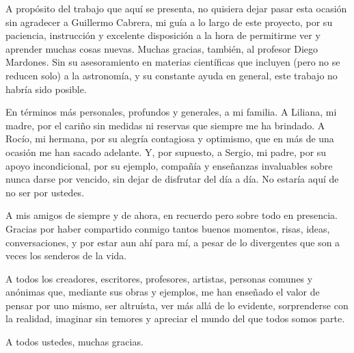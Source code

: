 \documentclass[upright, contnum]{umemoria}
\begin{document}
\begin{thanks}
A propósito del trabajo que aquí se presenta, no quisiera dejar pasar esta ocasión sin agradecer a Guillermo Cabrera, mi guía a lo largo de este proyecto, por su paciencia, instrucción y excelente disposición a la hora de permitirme ver y aprender muchas cosas nuevas. Muchas gracias, también, al profesor Diego Mardones. Sin su asesoramiento en materias científicas que incluyen (pero no se reducen solo) a la astronomía, y su constante ayuda en general, este trabajo no habría sido posible.

En términos más personales, profundos y generales, a mi familia. A Liliana, mi madre, por el cariño sin medidas ni reservas que siempre me ha brindado. A Rocío, mi hermana, por su alegría contagiosa y optimismo, que en más de una ocasión me han sacado adelante. Y, por supuesto, a Sergio, mi padre, por su apoyo incondicional, por su ejemplo, compañía y enseñanzas invaluables sobre nunca darse por vencido, sin dejar de disfrutar del día a día. No estaría aquí de no ser por ustedes.

A mis amigos de siempre y de ahora, en recuerdo pero sobre todo en presencia. Gracias por haber compartido conmigo tantos buenos momentos, risas, ideas, conversaciones, y por estar aun ahí para mí, a pesar de lo divergentes que son a veces los senderos de la vida.

A todos los creadores, escritores, profesores, artistas, personas comunes y anónimas que, mediante sus obras y ejemplos, me han enseñado el valor de pensar por uno mismo, ser altruísta, ver más allá de lo evidente, sorprenderse con la realidad, imaginar sin temores y apreciar el mundo del que todos somos parte.

A todos ustedes, muchas gracias.
\end{thanks}

\cleardoublepage
\begin{spacing}{1}
\tableofcontents
\listoffigures
\end{spacing}

\mainmatter








\nocite{*}


\end{document}
